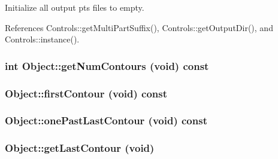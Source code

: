 Initialize all output pts files to empty. 

References Controls::getMultiPartSuffix(), Controls::getOutputDir(), and Controls::instance().\hypertarget{classObject_73aa0b9e0687d54c6f7e28897c53c60d}{
\subsubsection[getNumContours]{\setlength{\rightskip}{0pt plus 5cm}int Object::getNumContours (void) const}}
\label{classObject_73aa0b9e0687d54c6f7e28897c53c60d}


\hypertarget{classObject_0f77fffbc4778fab83b512d3461c9104}{
\subsubsection[firstContour]{ Object::firstContour (void) const}}
\label{classObject_0f77fffbc4778fab83b512d3461c9104}


\hypertarget{classObject_25ce9e8478daa0808393fa562a370d0e}{
\subsubsection[onePastLastContour]{ Object::onePastLastContour (void) const}}
\label{classObject_25ce9e8478daa0808393fa562a370d0e}


\hypertarget{classObject_fffbea3a9790bde6e0821ace2fe30b49}{
\subsubsection[getLastContour]{ Object::getLastContour (void)}}
\label{classObject_fffbea3a9790bde6e0821ace2fe30b49}


